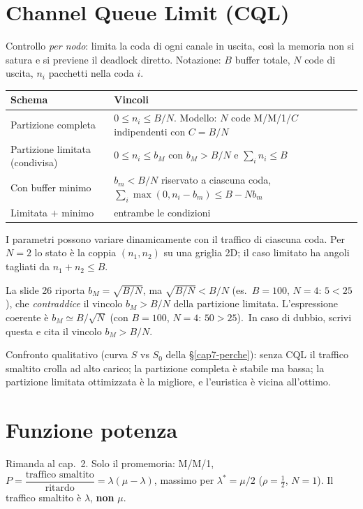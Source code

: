 \section{Channel Queue Limit (CQL)}\label{cap7-cql}
Controllo \emph{per nodo}: limita la coda di ogni canale in uscita, così la memoria non si satura e si previene il deadlock diretto. Notazione: $B$ buffer totale, $N$ code di uscita, $n_i$ pacchetti nella coda $i$.
\begin{center}
\small
\begin{tabularx}{\linewidth}{lX}
\toprule
Schema & Vincoli\\
\midrule
Partizione completa & $0\le n_i\le B/N$. Modello: $N$ code M/M/1/$C$ indipendenti con $C=B/N$\\
Partizione limitata (condivisa) & $0\le n_i\le b_M$ con $b_M>B/N$ e $\sum_in_i\le B$\\
Con buffer minimo & $b_m<B/N$ riservato a ciascuna coda, $\sum_i\max(0,n_i-b_m)\le B-Nb_m$\\
Limitata $+$ minimo & entrambe le condizioni\\
\bottomrule
\end{tabularx}
\end{center}
I parametri possono variare dinamicamente con il traffico di ciascuna coda. Per $N=2$ lo stato è la coppia $(n_1,n_2)$ su una griglia 2D; il caso limitato ha angoli tagliati da $n_1+n_2\le B$.

\begin{attenzione}
La slide 26 riporta $b_M=\sqrt{B/N}$, ma $\sqrt{B/N}<B/N$ (es.\ $B=100$, $N=4$: $5<25$), che \emph{contraddice} il vincolo $b_M>B/N$ della partizione limitata. L'espressione coerente è $\boxed{b_M\simeq B/\sqrt N}$ (con $B=100$, $N=4$: $50>25$).\mio\ In caso di dubbio, scrivi questa e cita il vincolo $b_M>B/N$.
\end{attenzione}
Confronto qualitativo (curva $S$ vs $S_0$ della §\ref{cap7-perche}): senza CQL il traffico smaltito crolla ad alto carico; la partizione completa è stabile ma bassa; la partizione limitata ottimizzata è la migliore, e l'euristica è vicina all'ottimo.

\section{Funzione potenza}
Rimanda al cap.~2. Solo il promemoria: M/M/1, $P=\dfrac{\text{traffico smaltito}}{\text{ritardo}}=\lambda(\mu-\lambda)$, massimo per $\lambda^*=\mu/2$ ($\rho=\tfrac12$, $N=1$). Il traffico smaltito è $\lambda$, \textbf{non} $\mu$.

